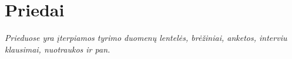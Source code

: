 \newpage
\section{Priedai}
\textit{Prieduose yra įterpiamos tyrimo duomenų lentelės, brėžiniai, anketos, interviu klausimai, nuotraukos ir pan.}
